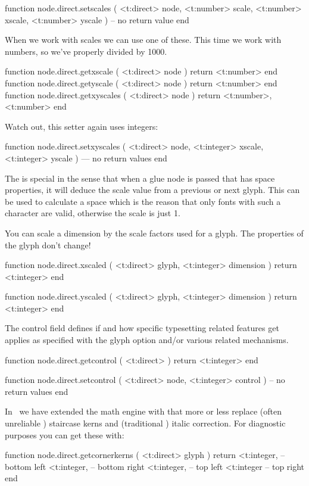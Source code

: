 function node.direct.setscales (
    <t:direct> node,
    <t:number> scale,
    <t:number> xscale,
    <t:number> yscale
)
    -- no return value
end
\stoptyping

When we work with scales we can use one of these. This time we work
with numbers, so we've properly divided by 1000.

\starttyping[option=LUA]
function node.direct.getxscale  ( <t:direct> node )
    return <t:number>
end
function node.direct.getyscale  ( <t:direct> node )
    return <t:number>
end
function node.direct.getxyscales ( <t:direct> node )
    return <t:number>,  <t:number>
end
\stoptyping

Watch out, this setter again uses integers:

\starttyping[option=LUA]
function node.direct.setxyscales (
    <t:direct>  node,
    <t:integer> xscale,
    <t:integer> yscale
)
    --- no return values
end
\stoptyping

The  is special in the sense that when a glue node is passed
that has space properties, it will deduce the scale value from a previous or next
glyph. This can be used to calculate a space which is the reason that only fonts
with such a character are valid, otherwise the scale is just 1.

You can scale a dimension by the scale factors used for a glyph. The properties
of the glyph don't change!

\starttyping[option=LUA]
function node.direct.xscaled (
    <t:direct>  glyph,
    <t:integer> dimension
)
    return <t:integer>
end

function node.direct.yscaled (
    <t:direct>  glyph,
    <t:integer> dimension
)
    return <t:integer>
end
\stoptyping

The control field defines if and how specific typesetting related features get
applies as specified with the glyph option and/or various related mechanisms.

\starttyping[option=LUA]
function node.direct.getcontrol (
    <t:direct>
)
    return <t:integer>
end

function node.direct.setcontrol (
    <t:direct>  node,
    <t:integer> control
)
    -- no return values
end
\stoptyping

In \LUAMETATEX\ we have extended the math engine with  that
more or less replace (often unreliable \OPENTYPE) staircase kerns and
(traditional \TEX) italic correction. For diagnostic purposes you can get these
with:

\starttyping[option=LUA]
function node.direct.getcornerkerns (
    <t:direct> glyph
)
    return
        <t:integer, -- bottom left
        <t:integer, -- bottom right
        <t:integer, -- top left
        <t:integer  -- top right
end
\stoptyping

